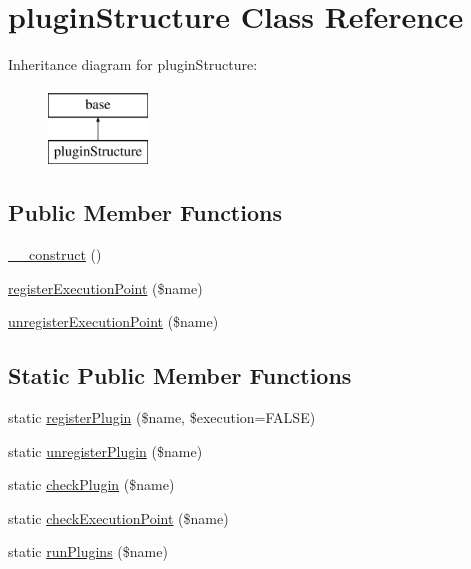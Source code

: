 \hypertarget{classplugin_structure}{
\section{pluginStructure Class Reference}
\label{classplugin_structure}
}
Inheritance diagram for pluginStructure:\begin{figure}[H]
\begin{center}
\leavevmode
\includegraphics[height=2.000000cm]{classplugin_structure}
\end{center}
\end{figure}
\subsection*{Public Member Functions}
\begin{DoxyCompactItemize}
\item 
\hyperlink{classplugin_structure_a095c5d389db211932136b53f25f39685}{\_\-\_\-construct} ()
\item 
\hyperlink{classplugin_structure_af373171b813a66ca3212b5b8445667b4}{registerExecutionPoint} (\$name)
\item 
\hyperlink{classplugin_structure_aececb4940a9e4e77b26cd5c21426b336}{unregisterExecutionPoint} (\$name)
\end{DoxyCompactItemize}
\subsection*{Static Public Member Functions}
\begin{DoxyCompactItemize}
\item 
static \hyperlink{classplugin_structure_a71565da9a4f7b79556318e1c239d806d}{registerPlugin} (\$name, \$execution=FALSE)
\item 
static \hyperlink{classplugin_structure_af6f30561b09fd0fd0e2a37ccdbb052cc}{unregisterPlugin} (\$name)
\item 
static \hyperlink{classplugin_structure_a3c152f2d9509388d1b23fd9b838da7ee}{checkPlugin} (\$name)
\item 
static \hyperlink{classplugin_structure_aeec65b154bc2668be48a94ea3c85a071}{checkExecutionPoint} (\$name)
\item 
static \hyperlink{classplugin_structure_a8dd32bd8570aaba99ee7b4e34e5f17f9}{runPlugins} (\$name)
\end{DoxyCompactItemize}


